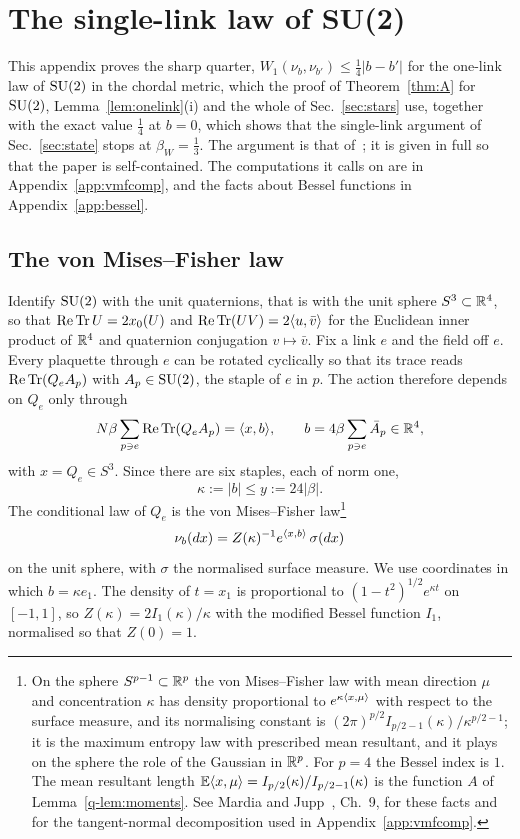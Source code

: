 \section{The single-link law of SU(2)}\label{app:sharp}

This appendix proves the sharp quarter, $W_1(\nu_b,\nu_{b'})\le\frac14|b-b'|$
for the one-link law of $\mathrm{SU}(2)$ in the chordal metric, which
the proof of Theorem~\ref{thm:A} for $\mathrm{SU}(2)$, Lemma~\ref{lem:onelink}(i) and the whole of
Sec.~\ref{sec:stars} use, together with the exact value $\frac14$ at $b=0$,
which shows that the single-link argument of Sec.~\ref{sec:state} stops at
$\beta_W=\frac13$. The argument is that of~\cite{BB26a}; it is given in full
so that the paper is self-contained. The computations it calls on are in
Appendix~\ref{app:vmfcomp}, and the facts about Bessel functions in
Appendix~\ref{app:bessel}.

\subsection{The von Mises--Fisher law}

Identify $\mathrm{SU}(2)$ with the unit quaternions, that is with the unit sphere
$S^3\subset\mathbb{R}^4$, so that $\operatorname{Re}\operatorname{Tr} U=2x_0(U)$ and $\operatorname{Re}\operatorname{Tr}(UV)=2\langle u,\bar v\rangle$
for the Euclidean inner product of $\mathbb{R}^4$ and quaternion conjugation
$v\mapsto\bar v$. Fix a link $e$ and the field off $e$. Every plaquette
through $e$ can be rotated cyclically so that its trace reads $\operatorname{Re}\operatorname{Tr}(Q_eA_p)$
with $A_p\in\mathrm{SU}(2)$, the staple of $e$ in $p$. The action therefore depends on
$Q_e$ only through
\[
N\beta\sum_{p\ni e}\operatorname{Re}\operatorname{Tr}(Q_eA_p)=\langle x,b\rangle,\qquad
b=4\beta\sum_{p\ni e}\bar A_p\in\mathbb{R}^4,
\]
with $x=Q_e\in S^3$. Since there are six staples, each of norm one,
\begin{equation}\label{q-eq:kappamax}
\kappa:=|b|\le y:=24|\beta| .
\end{equation}
The conditional law of $Q_e$ is the von Mises--Fisher law\footnote{On the
sphere $S^{p-1}\subset\mathbb{R}^p$ the von Mises--Fisher law with mean direction
$\mu$ and concentration $\kappa$ has density proportional to
$e^{\kappa\langle x,\mu\rangle}$ with respect to the surface measure, and its normalising
constant is $(2\pi)^{p/2}I_{p/2-1}(\kappa)/\kappa^{p/2-1}$; it is the maximum
entropy law with prescribed mean resultant, and it plays on the sphere the
role of the Gaussian in $\mathbb{R}^p$. For $p=4$ the Bessel index is $1$. The mean
resultant length $\mathbb{E}\langle x,\mu\rangle=I_{p/2}(\kappa)/I_{p/2-1}(\kappa)$ is the
function $A$ of Lemma~\ref{q-lem:moments}. See Mardia and Jupp~\cite{MJ00},
Ch.~9, for these facts and for the tangent-normal decomposition used in
Appendix~\ref{app:vmfcomp}.}
\begin{equation}\label{q-eq:vmf}
\nu_b(dx)=Z(\kappa)^{-1}e^{\langle x,b\rangle}\,\sigma(dx)
\end{equation}
on the unit sphere, with $\sigma$ the normalised surface measure. We use
coordinates in which $b=\kappa e_1$. The density of $t=x_1$ is proportional
to $(1-t^2)^{1/2}e^{\kappa t}$ on $[-1,1]$, so $Z(\kappa)=2I_1(\kappa)/\kappa$
with the modified Bessel function $I_1$, normalised so that $Z(0)=1$.

